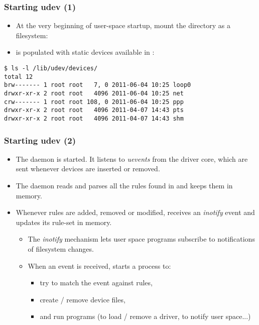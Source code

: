 \begin{frame}[fragile]
  \frametitle{Starting udev (1)}
  \begin{itemize}
  \item At the very beginning of user-space startup,
    mount the  directory as a  filesystem:\\
  \item {} is populated with static devices available in
    :
  \end{itemize}
  \begin{block}{}
\begin{verbatim}
$ ls -l /lib/udev/devices/
total 12
brw------- 1 root root   7, 0 2011-06-04 10:25 loop0
drwxr-xr-x 2 root root   4096 2011-06-04 10:25 net
crw------- 1 root root 108, 0 2011-06-04 10:25 ppp
drwxr-xr-x 2 root root   4096 2011-04-07 14:43 pts
drwxr-xr-x 2 root root   4096 2011-04-07 14:43 shm
\end{verbatim}
  \end{block}
\end{frame}

\begin{frame}
  \frametitle{Starting udev (2)}
  \begin{itemize}
  \item The  daemon is started.  It listens to {\em uevents}
    from the driver core, which are sent whenever devices are inserted
    or removed.
  \item The  daemon reads and parses all the rules found
    in  and keeps them in memory.
  \item Whenever rules are added, removed or modified, 
    receives an {\em inotify} event and updates its rule-set in memory.
    \begin{itemize}
    \item The {\em inotify} mechanism lets user space programs
      subscribe to notifications of filesystem changes.
    \item When an event is received,  starts a process to:
      \begin{itemize}
      \item try to match the event against  rules,
      \item create / remove device files,
      \item and run programs (to load / remove a driver, to notify user
        space...)
      \end{itemize}
    \end{itemize}
  \end{itemize}
\end{frame}

